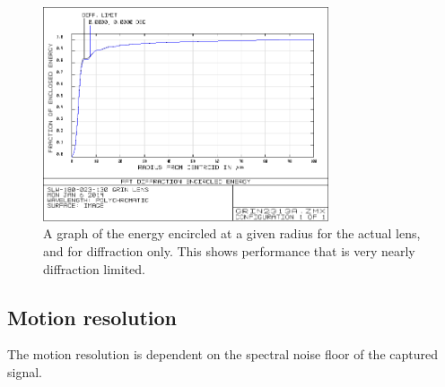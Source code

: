 \begin{figure}[h!]
\centering
\includegraphics[width=0.75\textwidth]{Images/Zemax/GRO-encircledenergy.png}
\caption{A graph of the energy encircled at a given radius for the actual lens, and for diffraction only. This shows performance that is very nearly diffraction limited.}
\end{figure}

\subsection{Motion resolution}

The motion resolution is dependent on the spectral noise floor of the captured signal.